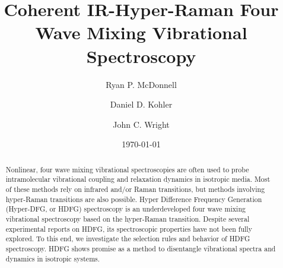 \documentclass[aip, jcp, reprint, onecolumn]{revtex4-2}
\begin{document}
\title{Coherent IR-Hyper-Raman Four Wave Mixing Vibrational Spectroscopy}


\author{Ryan P. McDonnell} 
\author{Daniel D. Kohler}
\author{John C. Wright} 


\date{\today}

\begin{abstract}
Nonlinear, four wave mixing vibrational spectroscopies are often used to probe intramolecular vibrational coupling and relaxation dynamics in isotropic media.
Most of these methods rely on infrared and/or Raman transitions, but methods involving hyper-Raman transitions are also possible. 
Hyper Difference Frequency Generation (Hyper-DFG, or HDFG) spectroscopy is an underdeveloped four wave mixing vibrational spectroscopy based on the hyper-Raman transition. 
Despite several experimental reports on HDFG, its spectroscopic properties have not been fully explored.  %
To this end, we investigate the selection rules and behavior of HDFG spectroscopy.
HDFG shows promise as a method to disentangle vibrational spectra and dynamics in isotropic systems.

\end{abstract}
\end{document}
